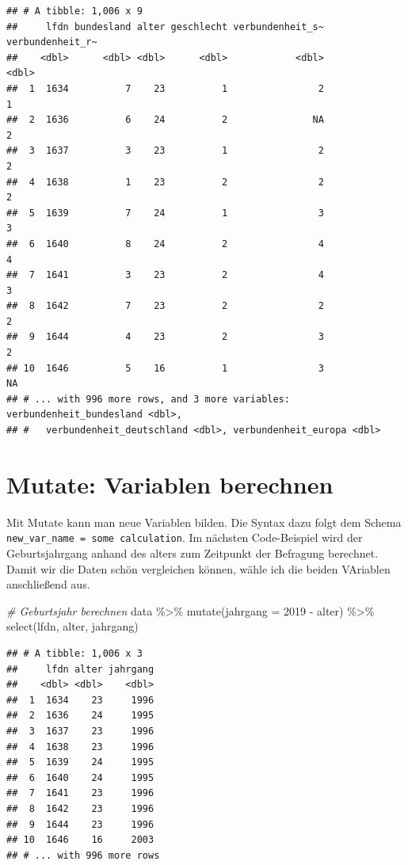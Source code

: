\documentclass[
]{book}
\newenvironment{Shaded}{\begin{snugshade}}{\end{snugshade}}
\newcommand{\AttributeTok}[1]{\textcolor[rgb]{0.77,0.63,0.00}{#1}}
\newcommand{\CommentTok}[1]{\textcolor[rgb]{0.56,0.35,0.01}{\textit{#1}}}
\newcommand{\DecValTok}[1]{\textcolor[rgb]{0.00,0.00,0.81}{#1}}
\newcommand{\FunctionTok}[1]{\textcolor[rgb]{0.00,0.00,0.00}{#1}}
\newcommand{\NormalTok}[1]{#1}
\newcommand{\SpecialCharTok}[1]{\textcolor[rgb]{0.00,0.00,0.00}{#1}}
\begin{document}
\begin{verbatim}
## # A tibble: 1,006 x 9
##     lfdn bundesland alter geschlecht verbundenheit_s~ verbundenheit_r~
##    <dbl>      <dbl> <dbl>      <dbl>            <dbl>            <dbl>
##  1  1634          7    23          1                2                1
##  2  1636          6    24          2               NA                2
##  3  1637          3    23          1                2                2
##  4  1638          1    23          2                2                2
##  5  1639          7    24          1                3                3
##  6  1640          8    24          2                4                4
##  7  1641          3    23          2                4                3
##  8  1642          7    23          2                2                2
##  9  1644          4    23          2                3                2
## 10  1646          5    16          1                3               NA
## # ... with 996 more rows, and 3 more variables: verbundenheit_bundesland <dbl>,
## #   verbundenheit_deutschland <dbl>, verbundenheit_europa <dbl>
\end{verbatim}

\hypertarget{mutate-variablen-berechnen}{%
\section{Mutate: Variablen berechnen}\label{mutate-variablen-berechnen}}

Mit Mutate kann man neue Variablen bilden. Die Syntax dazu folgt dem Schema \texttt{new\_var\_name\ =\ some\ calculation}. Im nächsten Code-Beispiel wird der Geburtsjahrgang anhand des alters zum Zeitpunkt der Befragung berechnet. Damit wir die Daten schön vergleichen können, wähle ich die beiden VAriablen anschließend aus.

\begin{Shaded}
\begin{Highlighting}[]
\CommentTok{\# Geburtsjahr berechnen}
\NormalTok{data }\SpecialCharTok{\%\textgreater{}\%} 
  \FunctionTok{mutate}\NormalTok{(}\AttributeTok{jahrgang =} \DecValTok{2019} \SpecialCharTok{{-}}\NormalTok{ alter) }\SpecialCharTok{\%\textgreater{}\%} 
  \FunctionTok{select}\NormalTok{(lfdn, alter, jahrgang)}
\end{Highlighting}
\end{Shaded}

\begin{verbatim}
## # A tibble: 1,006 x 3
##     lfdn alter jahrgang
##    <dbl> <dbl>    <dbl>
##  1  1634    23     1996
##  2  1636    24     1995
##  3  1637    23     1996
##  4  1638    23     1996
##  5  1639    24     1995
##  6  1640    24     1995
##  7  1641    23     1996
##  8  1642    23     1996
##  9  1644    23     1996
## 10  1646    16     2003
## # ... with 996 more rows
\end{verbatim}
\end{document}
